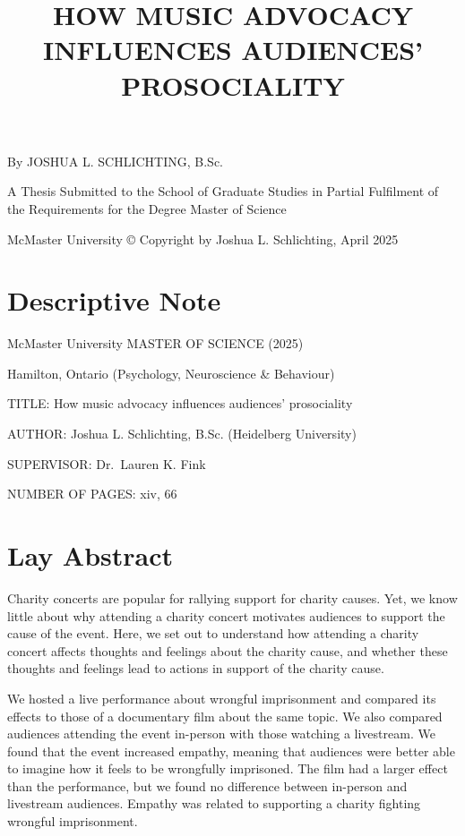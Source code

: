\documentclass[
  man,floatsintext]{apa6}
\title{HOW MUSIC ADVOCACY INFLUENCES AUDIENCES' PROSOCIALITY}
\author{\phantom{0}}
\date{}
\affiliation{\phantom{0}}
\begin{document}
\maketitle

\thispagestyle{secondtitle} 
\begin{center}

By JOSHUA L. SCHLICHTING, B.Sc.  
\newline

A Thesis Submitted to the School of Graduate Studies in Partial Fulfilment of the Requirements for the Degree Master of Science  
\newline

McMaster University © Copyright by Joshua L. Schlichting, April 2025  
\end{center}

\newpage

\section*{Descriptive Note}\label{descriptive-note}

\setcounter{page}{2}

McMaster University MASTER OF SCIENCE (2025)

Hamilton, Ontario (Psychology, Neuroscience \& Behaviour)
\newline

TITLE: How music advocacy influences audiences' prosociality

AUTHOR: Joshua L. Schlichting, B.Sc. (Heidelberg University)

SUPERVISOR: Dr.~Lauren K. Fink

NUMBER OF PAGES: xiv, 66

\newpage

\section*{Lay Abstract}\label{lay-abstract}

Charity concerts are popular for rallying support for charity causes. Yet, we know little about why attending a charity concert motivates audiences to support the cause of the event. Here, we set out to understand how attending a charity concert affects thoughts and feelings about the charity cause, and whether these thoughts and feelings lead to actions in support of the charity cause.

We hosted a live performance about wrongful imprisonment and compared its effects to those of a documentary film about the same topic. We also compared audiences attending the event in-person with those watching a livestream. We found that the event increased empathy, meaning that audiences were better able to imagine how it feels to be wrongfully imprisoned. The film had a larger effect than the performance, but we found no difference between in-person and livestream audiences. Empathy was related to supporting a charity fighting wrongful imprisonment.
\end{document}
